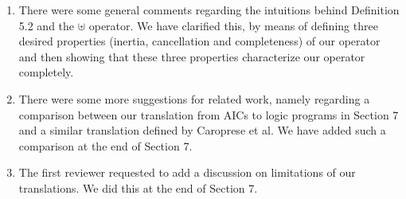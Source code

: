 \documentclass{article}
\begin{document}
\begin{enumerate}
\begin{itemize}
\end{itemize}
\item There were some general comments regarding the intuitions behind Definition 5.2 and the $\uplus$ operator. We have clarified this, by means of defining three desired properties (inertia, cancellation and completeness) of our operator and then showing that these three properties characterize our operator completely. 
\item There were some more suggestions for related work, namely regarding a comparison between our translation from AICs to logic programs in Section 7 and a similar translation defined by Caroprese et al. We have added such a comparison at the end of Section 7.
\item The first reviewer requested to add a discussion on limitations of our translations. We did this at the end of Section 7. 
	  \end{enumerate}
% 



\end{document}
